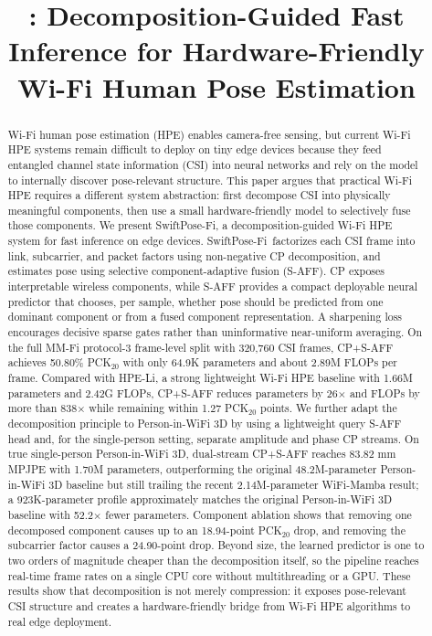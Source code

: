 \documentclass[10pt,conference]{IEEEtran}
\title{\method: Decomposition-Guided Fast Inference for Hardware-Friendly Wi-Fi Human Pose Estimation}
\author{
\IEEEauthorblockN{Toan D. Gian}
\IEEEauthorblockA{TODO: affiliation\\
TODO: email}
}
\newcommand{\method}{SwiftPose-Fi}
\begin{document}
\maketitle

\begin{abstract}
Wi-Fi human pose estimation (HPE) enables camera-free sensing, but current Wi-Fi HPE systems remain difficult to deploy on tiny edge devices because they feed entangled channel state information (CSI) into neural networks and rely on the model to internally discover pose-relevant structure. This paper argues that practical Wi-Fi HPE requires a different system abstraction: first decompose CSI into physically meaningful components, then use a small hardware-friendly model to selectively fuse those components. We present \method, a decomposition-guided Wi-Fi HPE system for fast inference on edge devices. \method\ factorizes each CSI frame into link, subcarrier, and packet factors using non-negative CP decomposition, and estimates pose using selective component-adaptive fusion (S-AFF). CP exposes interpretable wireless components, while S-AFF provides a compact deployable neural predictor that chooses, per sample, whether pose should be predicted from one dominant component or from a fused component representation. A sharpening loss encourages decisive sparse gates rather than uninformative near-uniform averaging. On the full MM-Fi protocol-3 frame-level split with 320,760 CSI frames, CP+S-AFF achieves 50.80\% PCK$_{20}$ with only 64.9K parameters and about 2.89M FLOPs per frame. Compared with HPE-Li, a strong lightweight Wi-Fi HPE baseline with 1.66M parameters and 2.42G FLOPs, CP+S-AFF reduces parameters by 26$\times$ and FLOPs by more than 838$\times$ while remaining within 1.27 PCK$_{20}$ points. We further adapt the decomposition principle to Person-in-WiFi 3D by using a lightweight query S-AFF head and, for the single-person setting, separate amplitude and phase CP streams. On true single-person Person-in-WiFi 3D, dual-stream CP+S-AFF reaches 83.82 mm MPJPE with 1.70M parameters, outperforming the original 48.2M-parameter Person-in-WiFi 3D baseline but still trailing the recent 2.14M-parameter WiFi-Mamba result; a 923K-parameter profile approximately matches the original Person-in-WiFi 3D baseline with 52.2$\times$ fewer parameters. Component ablation shows that removing one decomposed component causes up to an 18.94-point PCK$_{20}$ drop, and removing the subcarrier factor causes a 24.90-point drop. Beyond size, the learned predictor is one to two orders of magnitude cheaper than the decomposition itself, so the pipeline reaches real-time frame rates on a single CPU core without multithreading or a GPU. These results show that decomposition is not merely compression: it exposes pose-relevant CSI structure and creates a hardware-friendly bridge from Wi-Fi HPE algorithms to real edge deployment.
\end{abstract}
\end{document}
